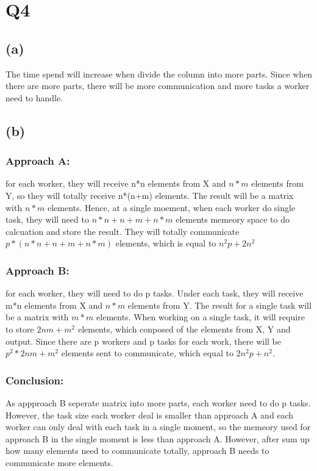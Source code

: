 \documentclass{article}\usepackage[]{graphicx}\usepackage[]{color}
\begin{document}
\section{Q4}
\subsection{(a)}
The time spend will increase when divide the column into more parts. Since when there are more parts, there will be more communication and more tasks a worker need to handle.\\

\subsection{(b)}
\subsubsection*{Approach A:}
for each worker, they will receive n*n elements from X and $n*m$ elements from Y, so they will totally receive n*(n+m) elements. The result will be a matrix with $n*m$ elements. Hence, at a single moement, when each worker do single task, they will need to $n*n+n+m+n*m$ elements memeory space to do calcuation and store the result. They will totally communicate $p*(n*n+n+m+n*m)$ elements, which is equal to $n^{2}p+2n^{2}$\\

\subsubsection*{Approach B:}
for each worker, they will need to do p tasks. Under each task, they will receive m*n elements from X and $n*m$ elements from Y. The result for a single task will be a matrix with $m*m$ elements. When working on a single task, it will require to store $2nm+m^{2}$ elements, which conposed of the elements from X, Y and output. Since there are p workers and p tasks for each work, there will be $p^{2}*2nm+m^{2}$ elements sent to communicate, which equal to $2n^{2}p+n^{2}$.\\

\subsubsection*{Conclusion:}
As appproach B seperate matrix into more parts, each worker need to do p tasks. However, the task size each worker deal is smaller than approach A and each worker can only deal with each task in a single moment, so the memeory used for approach B in the single moment is less than approach A. However, after sum up how many elements need to communicate totally, approach B needs to communicate more elements.\\\\
\end{document}
